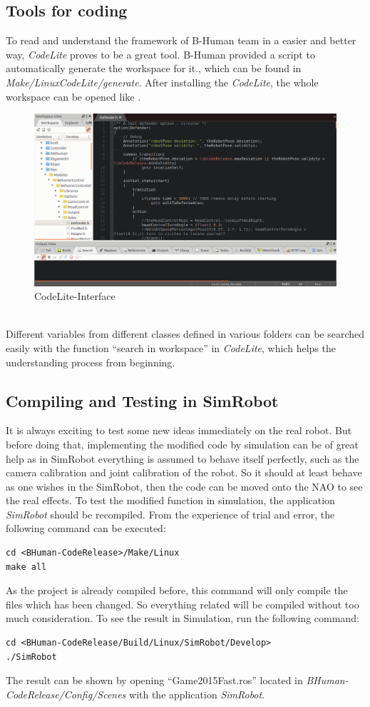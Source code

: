 \subsection{Tools for coding}
To read and understand the framework of B-Human team in a easier and better way, \textit{CodeLite} proves to be a great tool. B-Human provided a script to automatically generate the workspace for it., which can be found in \textit{Make/LinuxCodeLite/generate}. After installing the \textit{CodeLite}, the whole workspace can be opened like .
\begin{figure}[!htb]
    \includegraphics[width=\textwidth]{pics/CodeLite-Interface}
    \centering
    \caption{CodeLite-Interface}
    \label{CoLiIn}
\end{figure}\\
Different variables from different classes defined in various folders can be searched easily with the function ``search in workspace'' in \textit{CodeLite}, which helps the understanding process from beginning.

\subsection{Compiling and Testing in SimRobot}
It is always exciting to test some new ideas immediately on the real robot. But before doing that, implementing the modified code by simulation can be of great help as in SimRobot everything is assumed to behave itself perfectly, such as the camera calibration and joint calibration of the robot. So it should at least behave as one wishes in the SimRobot, then the code can be moved onto the NAO to see the real effects.
To test the modified function in simulation, the application \textit{SimRobot} should be recompiled. From the experience of trial and error, the following command can be executed:
\begin{lstlisting}
cd <BHuman-CodeRelease>/Make/Linux
make all
\end{lstlisting}
As the project is already compiled before, this command will only compile the files which has been changed. So everything related will be compiled without too much consideration.
To see the result in Simulation, run the following command:
\begin{lstlisting}
cd <BHuman-CodeRelease/Build/Linux/SimRobot/Develop>
./SimRobot
\end{lstlisting}
The result can be shown by opening ``Game2015Fast.ros'' located in \textit{BHuman-CodeRelease/Config/Scenes} with the application \textit{SimRobot}.


